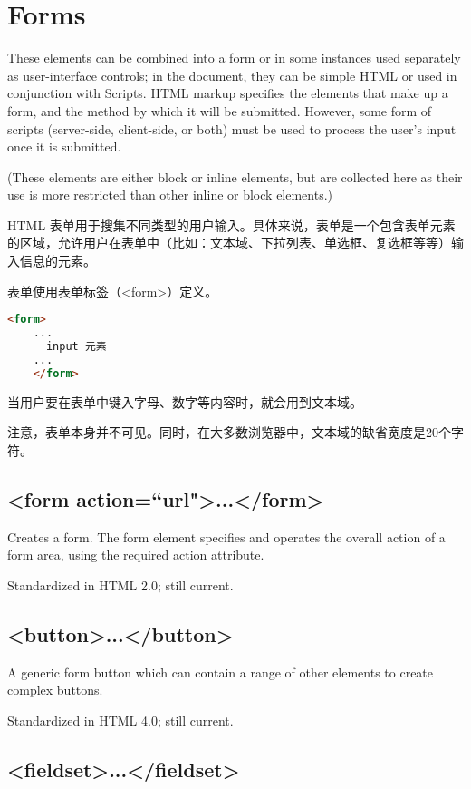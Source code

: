 \section{Forms}


These elements can be combined into a form or in some instances used separately as user-interface controls; in the document, they can be simple HTML or used in conjunction with Scripts. HTML markup specifies the elements that make up a form, and the method by which it will be submitted. However, some form of scripts (server-side, client-side, or both) must be used to process the user’s input once it is submitted.




(These elements are either block or inline elements, but are collected here as their use is more restricted than other inline or block elements.)


HTML 表单用于搜集不同类型的用户输入。具体来说，表单是一个包含表单元素的区域，允许用户在表单中（比如：文本域、下拉列表、单选框、复选框等等）输入信息的元素。

表单使用表单标签（<form>）定义。

\begin{lstlisting}[language=HTML]
	<form>
	...
	  input 元素
	...
	</form>
\end{lstlisting}

当用户要在表单中键入字母、数字等内容时，就会用到文本域。

注意，表单本身并不可见。同时，在大多数浏览器中，文本域的缺省宽度是20个字符。


\subsection{<form action=``url">...</form>}

Creates a form. The form element specifies and operates the overall action of a form area, using the required action attribute.

Standardized in HTML 2.0; still current.


\subsection{<button>...</button>}

A generic form button which can contain a range of other elements to create complex buttons.

Standardized in HTML 4.0; still current.




\subsection{<fieldset>...</fieldset>}


